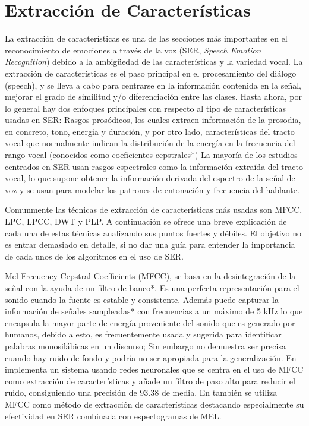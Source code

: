 \documentclass[11pt,a4paper,spanish]{book}
\begin{document}
	\section{Extracción de Características}
	La extracción de características es una de las secciones más importantes en el reconocimiento de emociones a través de la voz (SER, \emph{Speech Emotion Recognition}) debido a la ambigüedad de las características y la variedad vocal. La extracción de características es el paso principal en el procesamiento del diálogo (speech), y se lleva a cabo para centrarse en la información contenida en la señal, mejorar el grado de similitud y/o diferenciación entre las clases.\cite{Hellbernd2016} Hasta ahora, por lo general hay dos enfoques principales  con respecto al tipo de características usadas en SER:
	Rasgos prosódicos, los cuales extraen información de la prosodia, en concreto, tono, energía y duración, y por otro lado, características del tracto vocal que normalmente indican la distribución de la energía en la frecuencia del rango vocal (conocidos como coeficientes cepstrales*)
	La mayoría de los estudios centrados en SER usan rasgos espectrales como la información extraída del tracto vocal, lo que supone obtener la información derivada del espectro de la señal de voz y se usan para modelar los patrones de entonación y frecuencia del hablante.\cite{Langari2020}

	Comunmente las técnicas de extracción de características más usadas son 
	MFCC, LPC, LPCC, DWT y PLP. A continuación se ofrece una breve explicación de cada una de estas técnicas analizando sus puntos fuertes y débiles.\cite{Rashid2018} El objetivo no es entrar demasiado en detalle, si no dar una guía para entender la importancia de cada unos de los algoritmos en el uso de SER.
	
	Mel Frecuency Cepstral Coefficients (MFCC), se basa en la desintegración de la señal con la ayuda de un filtro de banco*. Es una perfecta representación para el sonido cuando la fuente es estable y consistente. Además puede capturar la información de señales sampleadas* con frecuencias a un máximo de 5 kHz lo que encapsula la mayor parte de energía proveniente del sonido que es generado por humanos, debido a esto, es frecuentemente usada y sugerida para identificar palabras monosilábicas en un discurso; Sin embargo no demuestra ser precisa cuando hay ruido de fondo y podría no ser apropiada para la generalización. En \cite{Sarkania2013} implementa un sistema usando redes neuronales que se centra en el uso de MFCC como extracción de características y añade un filtro  de paso alto para reducir el ruido, consiguiendo una precisión de 93.38 de media. En \cite{Wang2020} también se utiliza MFCC como método de extracción de características destacando especialmente su efectividad en SER combinada con espectogramas de MEL.
	
\end{document}
